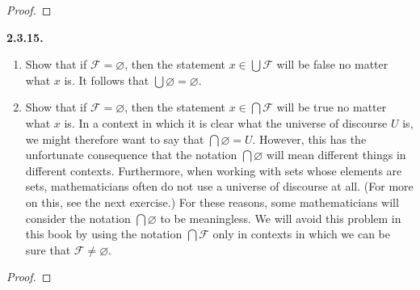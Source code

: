 \documentclass[12pt]{amsart}
\newenvironment{statement}[1]{\smallskip\noindent\color[rgb]{.6627, .3529, .6314} {\bf #1.}}{}
\theoremstyle{definition}
\theoremstyle{remark}
\begin{document}
\begin{proof}
\end{proof}


\begin{statement}{2.3.15}
\begin{enumerate}
	\item Show that if $\mathcal{F} = \varnothing$, then the statement $x \in \bigcup \mathcal{F}$
	will be false no matter what $x$ is.
	It follows that $\bigcup \varnothing = \varnothing$.
	
	\item Show that if $\mathcal{F} = \varnothing$, then the statement $x \in \bigcap \mathcal{F}$
	will be true no matter what $x$ is.
	In a context in which it is clear what the universe of discourse $U$ is,
	we might therefore want to say that $\bigcap \varnothing = U$.
	However, this has the unfortunate consequence that the notation $\bigcap \varnothing$
	will mean different things in different contexts.
	Furthermore, when working with sets whose elements are sets,
	mathematicians often do not use a universe of discourse at all.
	(For more on this, see the next exercise.)
	For these reasons, some mathematicians will consider the notation $\bigcap \varnothing$
	to be meaningless.
	We will avoid this problem in this book by using the notation $\bigcap \mathcal{F}$
	only in contexts in which we can be sure that $\mathcal{F} \neq \varnothing$.
\end{enumerate}
\end{statement}

\begin{proof}
\end{proof}
\end{document}
